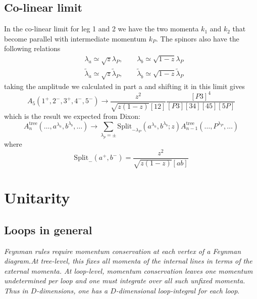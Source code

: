 \documentclass[a4paper,12pt]{article}
\begin{document}
\subsection{Co-linear limit}
In the co-linear limit for leg 1 and 2 we have the two momenta $k_1$ and $k_2$ that become parallel with intermediate momentum $k_P$. The spinors also have the following relations
\begin{align*}
&\lambda_a\simeq\sqrt{z}\lambda_P,\qquad \lambda_b\simeq \sqrt{1-z}\lambda_P\\
&\tilde\lambda_{\dot a}\simeq\sqrt{z}\tilde\lambda_P,\qquad \tilde\lambda_{\dot b}\simeq \sqrt{1-z}\tilde\lambda_P
\end{align*}
taking the amplitude we calculated in part a and shifting it in this limit gives
\[
A_5(1^+,2^-,3^+,4^-,5^-)\to \frac{z^2}{\sqrt{z(1-z)}[12]}\frac{[P3]^4}{[P3][34][45][5P]}
\]
which is the result we expected from Dixon:
\begin{equation}
A_{n}^{\text{tree}}(\dots,a^{\lambda_a},b^{\lambda_b},\dots)\to \sum_{\lambda_p=\pm}\text{Split}_{-\lambda_P}(a^{\lambda_a},b^{\lambda_b};z)A^{\text{tree}}_{n-1}(\dots,P^{\lambda_P},\dots)
\end{equation}
where
\begin{equation}
\text{Split}_{-}(a^+,b^-)=\frac{z^2}{\sqrt{z(1-z)}[ab]}
\end{equation}
%
\section{Unitarity}
\subsection{Loops in general}
\textit{Feynman rules require momentum conservation at each vertex of a Feynman diagram.At tree-level, this fixes all momenta of the internal lines in terms of the external momenta. At loop-level, momentum conservation leaves one momentum undetermined per loop and one must integrate over all such unfixed momenta. Thus in $D$-dimensions, one has a $D$-dimensional loop-integral for each loop}.
\end{document}
